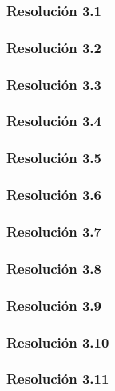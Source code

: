 \subsubsection{Resolución 3.1}


\subsubsection{Resolución 3.2}


\subsubsection{Resolución 3.3}


\subsubsection{Resolución 3.4}


\subsubsection{Resolución 3.5}


\subsubsection{Resolución 3.6}


\subsubsection{Resolución 3.7}


\subsubsection{Resolución 3.8}


\subsubsection{Resolución 3.9}


\subsubsection{Resolución 3.10}


\subsubsection{Resolución 3.11}

